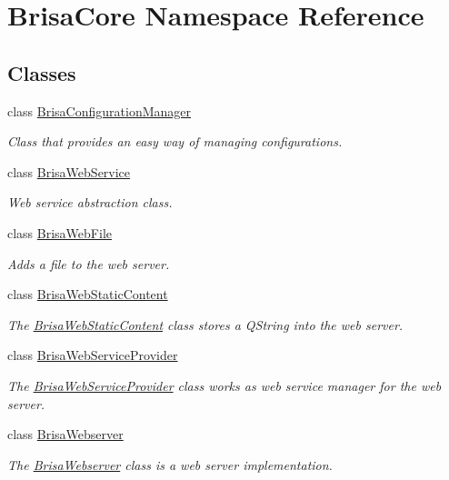 \hypertarget{namespaceBrisaCore}{
\section{BrisaCore Namespace Reference}
\label{namespaceBrisaCore}
}
\subsection*{Classes}
\begin{DoxyCompactItemize}
\item 
class \hyperlink{classBrisaCore_1_1BrisaConfigurationManager}{BrisaConfigurationManager}
\begin{DoxyCompactList}\small\item\em Class that provides an easy way of managing configurations. \item\end{DoxyCompactList}\item 
class \hyperlink{classBrisaCore_1_1BrisaWebService}{BrisaWebService}
\begin{DoxyCompactList}\small\item\em Web service abstraction class. \item\end{DoxyCompactList}\item 
class \hyperlink{classBrisaCore_1_1BrisaWebFile}{BrisaWebFile}
\begin{DoxyCompactList}\small\item\em Adds a file to the web server. \item\end{DoxyCompactList}\item 
class \hyperlink{classBrisaCore_1_1BrisaWebStaticContent}{BrisaWebStaticContent}
\begin{DoxyCompactList}\small\item\em The \hyperlink{classBrisaCore_1_1BrisaWebStaticContent}{BrisaWebStaticContent} class stores a QString into the web server. \item\end{DoxyCompactList}\item 
class \hyperlink{classBrisaCore_1_1BrisaWebServiceProvider}{BrisaWebServiceProvider}
\begin{DoxyCompactList}\small\item\em The \hyperlink{classBrisaCore_1_1BrisaWebServiceProvider}{BrisaWebServiceProvider} class works as web service manager for the web server. \item\end{DoxyCompactList}\item 
class \hyperlink{classBrisaCore_1_1BrisaWebserver}{BrisaWebserver}
\begin{DoxyCompactList}\small\item\em The \hyperlink{classBrisaCore_1_1BrisaWebserver}{BrisaWebserver} class is a web server implementation. \item\end{DoxyCompactList}\end{DoxyCompactItemize}
